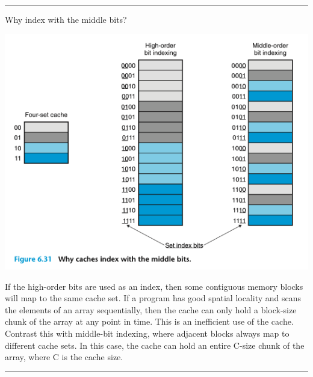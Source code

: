\documentclass[11pt]{article}
\begin{document}
\noindent\rule{\textwidth}{0.5pt}
Why index with the middle bits?\\

\begin{center}
\includegraphics[width=.9\linewidth]{pics/figure6.31-why-index-with-middle-bits.png}
\end{center}

If the high-order bits are used as an index, then some contiguous memory blocks will map to the same cache set. If a program has good spatial locality and scans the elements of an array sequentially, then the cache can only hold a block-size chunk of the array at any point in time. This is an inefficient use of the cache. Contrast this with middle-bit indexing, where adjacent blocks always map to different cache sets. In this case, the cache can hold an entire C-size chunk of the array, where C is the cache size.\\

\noindent\rule{\textwidth}{0.5pt}
\end{document}
